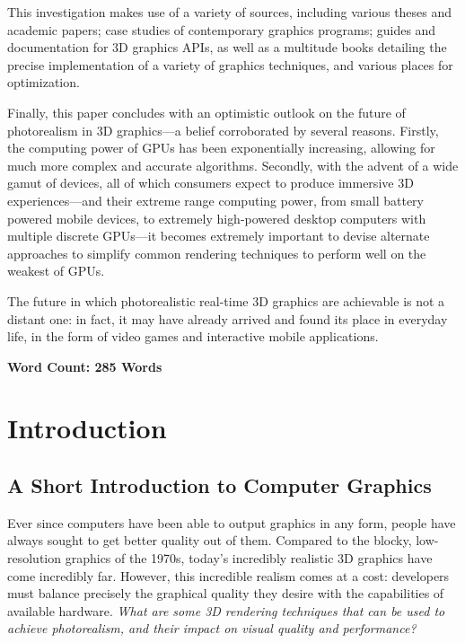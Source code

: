 \documentclass[11pt, oneside]{report}
\begin{document}
This investigation makes use of a variety of sources, including various theses and academic papers; case studies of contemporary graphics programs; guides and documentation for 3D graphics \glspl{API}, as well as a multitude books detailing the precise implementation of a variety of graphics techniques, and various places for optimization.

Finally, this paper concludes with an optimistic outlook on the future of photorealism in 3D graphics—a belief corroborated by several reasons. Firstly, the computing power of \glspl{GPU} has been exponentially increasing, allowing for much more complex and accurate algorithms. Secondly, with the advent of a wide gamut of devices, all of which consumers expect to produce immersive 3D experiences---and their extreme range computing power, from small battery powered mobile devices, to extremely high-powered desktop computers with multiple discrete \glspl{GPU}---it becomes extremely important to devise alternate approaches to simplify common rendering techniques to perform well on the weakest of \glspl{GPU}.

The future in which photorealistic real-time 3D graphics are achievable is not a distant one: in fact, it may have already arrived and found its place in everyday life, in the form of video games and interactive mobile applications.

\textbf{Word Count: 285 Words}

\tableofcontents

\chapter{Introduction}
\section{A Short Introduction to Computer Graphics}
Ever since computers have been able to output graphics in any form, people have always sought to get better quality out of them. Compared to the blocky, low-resolution graphics of the 1970s, today’s incredibly realistic 3D graphics have come incredibly far. However, this incredible realism comes at a cost: developers must balance precisely the graphical quality they desire with the capabilities of available hardware. \textit{What are some 3D rendering techniques that can be used to achieve photorealism, and their impact on visual quality and performance?}
\end{document}
